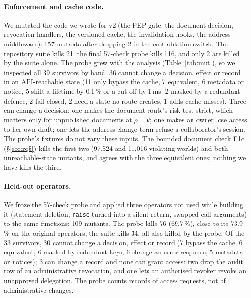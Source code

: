\documentclass[sigconf,review,anonymous]{acmart}
\begin{document}
\paragraph{Enforcement and cache code.} We mutated the code we wrote for v2 (the PEP gate, the document decision,
revocation handlers, the versioned cache, the invalidation hooks, the address middleware): 157 mutants after
dropping 2 in the cost-ablation switch. The repository suite kills 21; the final 57-check probe kills 116, and only 2
are killed by the suite alone. The probe grew with the analysis (Table~\ref{tab:mut}), so we inspected all 39 survivors by
hand. 36 cannot change a decision, effect or record in an API-reachable state (11 only bypass the cache, 7
equivalent, 6 metadata or notice, 5 shift a lifetime by 0.1\,\% or a cut-off by 1\,ms, 2 masked by a redundant
defence, 2 fail closed, 2 need a state no route creates, 1 adds cache misses). Three can change a decision: one makes the document route's risk test
strict, which matters only for unpublished documents at $\rho=\theta$; one makes an owner lose access to her own
draft; one lets the address-change term refuse a collaborator's session. The probe's fixtures do not vary these inputs. The bounded document check E1c (\S\ref{sec:rq5}) kills the first two (97{,}524 and 11{,}016 violating worlds)
and both unreachable-state mutants, and agrees with the three equivalent ones; nothing we have kills the third.

\paragraph{Held-out operators.} We froze the 57-check probe and applied three operators not used while building it
(statement deletion, \texttt{raise} turned into a silent return, swapped call arguments) to the same functions: 109
mutants. The probe kills 76 (69.7\,\%), close to its 73.9\,\% on the original operators; the suite kills 34, all also
killed by the probe. Of the 33 survivors, 30 cannot change a decision, effect or record (7 bypass the cache, 6
equivalent, 6 masked by redundant keys, 6 change an error response, 5 metadata or notices); 3 can change a record and
none can grant access: two drop the audit row of an administrative revocation, and one lets an authorised revoker
revoke an unapproved delegation. The probe counts records of access requests, not of administrative changes.
\end{document}
